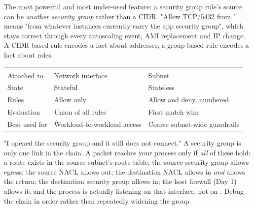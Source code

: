 The most powerful and most under-used feature: a security group rule's source can be \emph{another security group} rather than a CIDR. "Allow TCP/5432 from " means "from whatever instances currently carry the app security group", which stays correct through every autoscaling event, AMI replacement and IP change. A CIDR-based rule encodes a fact about addresses; a group-based rule encodes a fact about roles.

\begin{consolemock}
\end{consolemock}

\begin{center}\small
\wbrowcolors
\begin{tabularx}{\linewidth}{@{}L{26mm} X X@{}}
 &  & \\
Attached to & Network interface & Subnet\\
State & Stateful & Stateless\\
Rules & Allow only & Allow and deny, numbered\\
Evaluation & Union of all rules & First match wins\\
Best used for & Workload-to-workload access & Coarse subnet-wide guardrails\\
\end{tabularx}
\end{center}

\begin{misconception}
"I opened the security group and it still does not connect." A security group is only one link in the chain. A packet reaches your process only if \emph{all} of these hold: a route exists in the source subnet's route table; the source security group allows egress; the source NACL allows out; the destination NACL allows in \emph{and} allows the return; the destination security group allows in; the host firewall (Day 1) allows it; and the process is actually listening on that interface, not on . Debug the chain in order rather than repeatedly widening the group.
\end{misconception}


